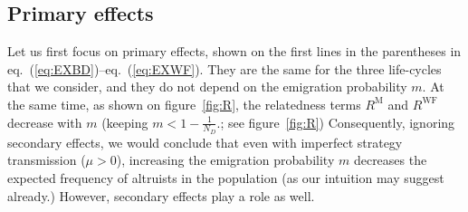 \documentclass[11pt, letterpaper]{article}
\renewcommand{\eqref}[1]{\textup{{\normalfont eq.~(\ref{#1}}\normalfont)}}
\newcommand{\Moran}{\textrm{M}}
\newcommand{\WF}{\textrm{WF}}
\newcommand{\ndemes}{N_D}
\begin{document}
\subsection{Primary effects}

Let us first focus on primary effects, shown on the first lines in the parentheses in \eqref{eq:EXBD}--\eqref{eq:EXWF}. They are the same for the three life-cycles that we consider, and they do not depend on the emigration probability $m$. At the same time, as shown on figure~\ref{fig:R}, the relatedness terms $R^{\Moran}$ and $R^{\WF}$ decrease with $m$ (keeping $m<1 - \frac{1}{\ndemes}$.; see figure~\ref{fig:R}) Consequently, ignoring secondary effects, we would conclude that even with imperfect strategy transmission ($\mu>0$), increasing the emigration probability $m$ decreases the expected frequency of altruists in the population (as our intuition may suggest already.) However, secondary effects play a role as well.
\end{document}
